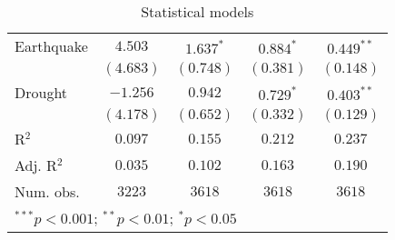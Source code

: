 \begin{table}
\begin{center}
\begin{tabular}{l c c c c}
Earthquake           & $4.503$         & $1.637^{*}$    & $0.884^{*}$    & $0.449^{**}$   \\
                     & $(4.683)$       & $(0.748)$      & $(0.381)$      & $(0.148)$      \\
Drought              & $-1.256$        & $0.942$        & $0.729^{*}$    & $0.403^{**}$   \\
                     & $(4.178)$       & $(0.652)$      & $(0.332)$      & $(0.129)$      \\
\hline
R$^2$                & $0.097$         & $0.155$        & $0.212$        & $0.237$        \\
Adj. R$^2$           & $0.035$         & $0.102$        & $0.163$        & $0.190$        \\
Num. obs.            & $3223$          & $3618$         & $3618$         & $3618$         \\
\hline
\multicolumn{5}{l}{\scriptsize{$^{***}p<0.001$; $^{**}p<0.01$; $^{*}p<0.05$}}
\end{tabular}
\caption{Statistical models}
\label{table:coefficients}
\end{center}
\end{table}

